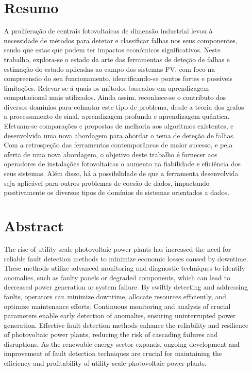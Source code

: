 \chapter*{Resumo}

A proliferação de centrais fotovoltaicas de dimensão industrial levou à necessidade de métodos para detetar e classificar falhas nos seus componentes, sendo que estas que podem ter impactos económicos significativos. Neste trabalho, explora-se o estado da arte das ferramentas de deteção de falhas e estimação do estado aplicadas ao campo dos sistemas PV, com foco na compreensão do seu funcionamento, identificando-se pontos fortes e possíveis limitações. Relevar-se-á quais os métodos baseados em aprendizagem computacional mais utilizados. Ainda assim, reconhece-se o contributo dos diversos domínios para colmatar este tipo de problema, desde a teoria dos grafos a processamento de sinal, aprendizagem profunda e aprendizagem quântica. Efetuam-se comparações e propostas de melhoria aos algoritmos existentes, e desenvolvida uma nova abordagem para abordar o tema de deteção de falhas. Com a retrospeção das ferramentas contemporâneas de maior sucesso, e pela oferta de uma nova abordagem, o objetivo deste trabalho é fornecer aos operadores de instalações fotovoltaicas o aumento na fiabilidade e eficiência dos seus sistemas. Além disso, há a possibilidade de que a ferramenta desenvolvida seja aplicável para outros problemas de coesão de dados, impactando positivamente os diversos tipos de domínios de sistemas orientados a dados.


\chapter*{Abstract}
The rise of utility-scale photovoltaic power plants has increased the need for reliable fault detection methods to minimize economic losses caused by downtime. These methods utilize advanced monitoring and diagnostic techniques to identify anomalies, such as faulty panels or degraded components, which can lead to decreased power generation or system failure. By swiftly detecting and addressing faults, operators can minimize downtime, allocate resources efficiently, and optimize maintenance efforts. Continuous monitoring and analysis of crucial parameters enable early detection of anomalies, ensuring uninterrupted power generation. Effective fault detection methods enhance the reliability and resilience of photovoltaic power plants, reducing the risk of cascading failures and disruptions. As the renewable energy sector expands, ongoing development and improvement of fault detection techniques are crucial for maintaining the efficiency and profitability of utility-scale photovoltaic power plants.

